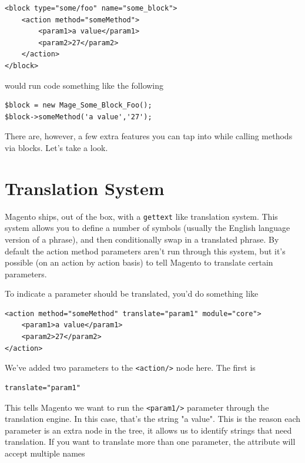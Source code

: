 \documentclass[oneside]{book}
\begin{document}
\begin{lstlisting}
<block type="some/foo" name="some_block">
    <action method="someMethod">
        <param1>a value</param1>
        <param2>27</param2>         
    </action>
</block>

\end{lstlisting}


would run code something like the following 

\begin{lstlisting}
$block = new Mage_Some_Block_Foo();
$block->someMethod('a value','27');

\end{lstlisting}


There are, however, a few extra features you can tap into while calling methods via blocks.  Let's take a look.

\section{Translation System}

Magento ships, out of the box, with a \footnotesize\texttt{gettext} \normalsize  like translation system.  This system allows you to define a number of symbols (usually the English language version of a phrase), and then conditionally swap in a translated phrase.  By default the action method parameters aren't run through this system, but it's possible (on an action by action basis) to tell Magento to translate certain parameters.  

To indicate a parameter should be translated, you'd do something like

\begin{lstlisting}
<action method="someMethod" translate="param1" module="core">
    <param1>a value</param1>
    <param2>27</param2>         
</action>

\end{lstlisting}


We've added two parameters to the \footnotesize\texttt{\textless action/\textgreater } \normalsize  node here. The first is 

\begin{lstlisting}
translate="param1"

\end{lstlisting}


This tells Magento we want to run the \footnotesize\texttt{\textless param1/\textgreater } \normalsize  parameter through the translation engine.  In this case, that's the string "a value".  This is the reason each parameter is an extra node in the tree, it allows us to identify strings that need translation.  If you want to translate more than one parameter, the attribute will accept multiple names
\end{document}
